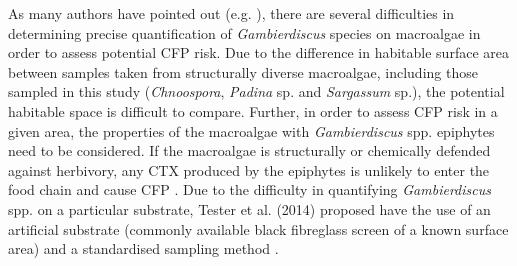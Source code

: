 \documentclass[12pt]{article}
\begin{document}

As many authors have pointed out (e.g. \citep{litaker2010global,bomber1989epiphytism,tester2014sampling,cruz2006macroalgal,parsons2011examination,globalcig,lobel1988assessment}), there are several difficulties in determining precise quantification of \textit{Gambierdiscus} species on macroalgae in order to assess potential CFP risk. 
Due to the difference in habitable surface area between samples taken from structurally diverse macroalgae, including those sampled in this study (\emph{Chnoospora}, \emph{Padina} sp. and \emph{Sargassum} sp.), the potential habitable space is difficult to compare. 
Further, in order to assess CFP risk in a given area, the properties of the macroalgae with \emph{Gambierdiscus} spp. epiphytes need to be considered. 
If the macroalgae is structurally or chemically defended against herbivory, any CTX produced by the epiphytes is unlikely to enter the food chain and cause CFP \citep{cruz2006macroalgal}. 
Due to the difficulty in quantifying \emph{Gambierdiscus} spp. on a particular substrate, Tester et al. (2014) proposed have the use of an artificial substrate (commonly available black fibreglass screen of a known surface area) and a standardised sampling method \citep{tester2014sampling}.
\end{document}
